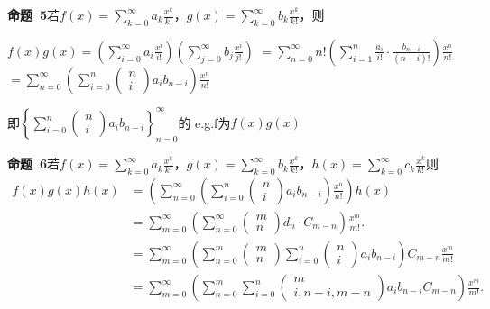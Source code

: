 \documentclass{report}
\begin{document}
\textbf{命题\ 5}若$f(x)=\sum_{k=0}^{\infty} a_{k} \frac{x^{k}}{k !}$，$g(x)=\sum_{k=0}^{\infty} b_{k} \frac{x^{k}}{k !}$，则

$f(x) g(x)=\left(\sum_{i=0}^{\infty} a_{i} \frac{x^{i}}{i !}\right)\left(\sum_{j=0}^{\infty} b_{j} \frac{x^{i}}{j !}\right)$
$=\sum_{n=0}^{\infty} n !\left(\sum_{i=1}^{n} \frac{a_{i}}{i !} \cdot \frac{b_{n-i}}{(n-i) !}\right) \frac{x^{n}}{n !}$
$=\sum_{n=0}^{\infty}\left(\sum_{i=0}^{n}\left(\begin{array}{l}n \\ i\end{array}\right) a_{i} b_{n-i}\right) \frac{x^{n}}{n !}$

即$\left\{\sum_{i=0}^{n}\left(\begin{array}{l}n \\ i\end{array}\right) a_{i}b_{n-i} \right\}_{n=0}^{\infty}$的
e.g.f为$f(x)g(x)$

\textbf{命题\ 6}若$f(x)=\sum_{k=0}^{\infty} a_{k} \frac{x^{k}}{k !}$，$g(x)=\sum_{k=0}^{\infty} b_{k} \frac{x^{k}}{k !}$，$h(x)=\sum_{k=0}^{\infty} c_{k} \frac{x^{k}}{k !}$则
$$
\begin{aligned}
f(x) g(x) h(x) &=\left(\sum_{n=0}^{\infty}\left(\sum_{i=0}^{n}\left(\begin{array}{l}
n \\ i
\end{array}\right) a_{i} b_{n-i}\right) \frac{x^{n}}{n !}\right) h(x) \\
&=\sum_{m=0}^{\infty}\left(\sum_{n=0}^{\infty}\left(\begin{array}{l}
m \\ n
\end{array}\right) d_{n} \cdot C_{m-n}\right) \frac{x^{m}}{m !}.\\
&=\sum_{m=0}^{\infty}\left(\sum_{n=0}^{m}\left(\begin{array}{l}
m \\ n
\end{array}\right) \sum_{i=0}^{n}\left(\begin{array}{l}
n \\ i
\end{array}\right) a_{i} b_{n-i}\right)C_{m-n} \frac{x^{m}}{m !} \\
&=\sum_{m=0}^{\infty}\left(\sum_{n=0}^{m} \sum_{i=0}^{n}\left(\begin{array}{c}
m \\i, n-i, m-n
\end{array}\right) a_{i} b_{n-i}C_{m-n} \right) \frac{x^{m}}{m !}.
\end{aligned}
$$
\end{document}
